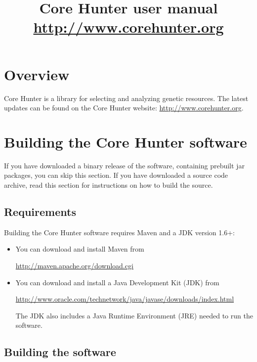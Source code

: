 \documentclass[a4paper, titlepage, 11pt]{article}
\begin{document}
\title{\Huge Core Hunter user manual\\[1ex] \Large \url{http://www.corehunter.org}}
\date{}

\maketitle

\section{Overview}

Core Hunter is a library for selecting and analyzing genetic
resources. The latest updates can be found on the Core Hunter website: \url{http://www.corehunter.org}.

\section{Building the Core Hunter software}

If you have downloaded a binary release of the software, containing prebuilt jar packages, you can skip this section. If you have downloaded a source code archive, read this section for instructions on how to build the source.

\subsection{Requirements}

Building the Core Hunter software requires Maven and a JDK version 1.6+:
\begin{itemize}
	
	\item You can download and install Maven from

	\url{http://maven.apache.org/download.cgi}

	\item You can download and install a Java Development Kit (JDK) from

	\url{http://www.oracle.com/technetwork/java/javase/downloads/index.html}

	The JDK also includes a Java Runtime Environment (JRE) needed to run the software.

\end{itemize}

\subsection{Building the software}
\end{document}

